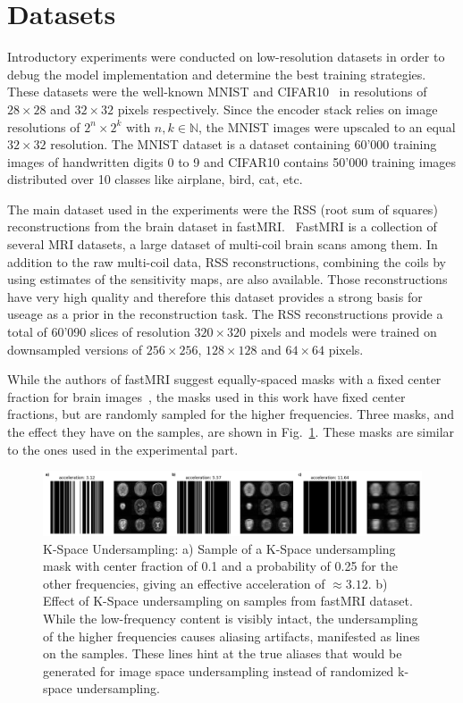 \section{Datasets}
Introductory experiments were conducted on low-resolution datasets in order to debug the model implementation and determine the best training strategies. These datasets were the well-known MNIST and CIFAR10~\autocite{mnist,cifar} in resolutions of $28\times28$ and $32\times32$ pixels respectively. Since the encoder stack relies on image resolutions of $2^n\times2^k$ with $n,k\in \mathbb{N}$, the MNIST images were upscaled to an equal $32\times32$ resolution. The MNIST dataset is a dataset containing 60'000 training images of handwritten digits 0 to 9 and CIFAR10 contains 50'000 training images distributed over 10 classes like airplane, bird, cat, etc.

The main dataset used in the experiments were the RSS (root sum of squares) reconstructions from the brain dataset in fastMRI.~\autocite{zbontar2018fastMRI} FastMRI is a collection of several MRI datasets, a large dataset of multi-coil brain scans among them. In addition to the raw multi-coil data, RSS reconstructions, combining the coils by using estimates of the sensitivity maps, are also available. Those reconstructions have very high quality and therefore this dataset provides a strong basis for useage as a prior in the reconstruction task. The RSS reconstructions provide a total of 60'090 slices of resolution $320\times320$ pixels and models were trained on downsampled versions of $256\times 256$, $128\times 128$ and $64\times 64$ pixels.

While the authors of fastMRI suggest equally-spaced masks with a fixed center fraction for brain images~\autocite{zbontar2018fastMRI}, the masks used in this work have fixed center fractions, but are randomly sampled for the higher frequencies. Three masks, and the effect they have on the samples, are shown in Fig.~\ref{fig:kspacemasking}. These masks are similar to the ones used in the experimental part.
\begin{figure}[h]
    \centering
    \includegraphics[width=\textwidth]{images/corruption_mask.png}
    \caption[K-Space Undersampling]{K-Space Undersampling: a) Sample of a K-Space undersampling mask with center fraction of 0.1 and a probability of 0.25 for the other frequencies, giving an effective acceleration of $\approx 3.12$. b) Effect of K-Space undersampling on samples from fastMRI dataset. While the low-frequency content is visibly intact, the undersampling of the higher frequencies causes aliasing artifacts, manifested as lines on the samples. These lines hint at the true aliases that would be generated for image space undersampling instead of randomized k-space undersampling.}
    \label{fig:kspacemasking}
\end{figure}



